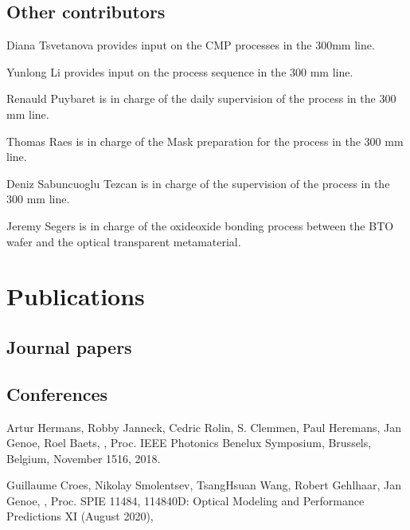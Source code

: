 \documentclass[a4paper,10pt,english,openany,oneside]{jupyterBook}
\begin{document}
\section{Other contributors}
\label{\detokenize{Team:other-contributors}}
\sphinxAtStartPar
Diana Tsvetanova provides input on the CMP processes in the 300mm line.

\sphinxAtStartPar
Yunlong Li provides input on the process sequence in the 300 mm line.

\sphinxAtStartPar
Renauld Puybaret is in charge of the daily supervision of the process in the 300 mm line.

\sphinxAtStartPar
Thomas Raes is in charge of the Mask preparation for the process in the 300 mm line.

\sphinxAtStartPar
Deniz Sabuncuoglu Tezcan is in charge of the supervision of the process in the 300 mm line.

\sphinxAtStartPar
Jeremy Segers is in charge of the oxide\sphinxhyphen{}oxide bonding process between the BTO wafer and the optical transparent metamaterial.

\sphinxstepscope


\chapter{Publications}
\label{\detokenize{Publications:publications}}\label{\detokenize{Publications::doc}}

\section{Journal papers}
\label{\detokenize{Publications:journal-papers}}

\section{Conferences}
\label{\detokenize{Publications:conferences}}
\sphinxAtStartPar
Artur Hermans,
Robby Janneck,
Cedric Rolin,
S. Clemmen,
Paul Heremans,
Jan Genoe,
Roel Baets,
,
Proc. IEEE Photonics Benelux Symposium, Brussels, Belgium, November 15\sphinxhyphen{}16, 2018.

\sphinxAtStartPar
Guillaume Croes,
Nikolay Smolentsev,
Tsang\sphinxhyphen{}Hsuan Wang,
Robert Gehlhaar,
Jan Genoe,
,
Proc. SPIE 11484, 114840D: Optical Modeling and Performance Predictions XI (August 2020),
\end{document}
